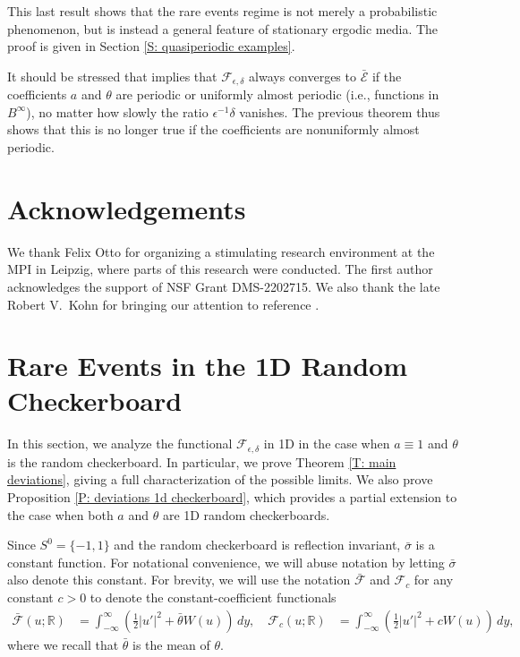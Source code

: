 \documentclass[10pt,a4paper]{amsart}
\begin{document}
This last result shows that the rare events regime is not merely a probabilistic phenomenon, but is instead a general feature of stationary ergodic media.  The proof is given in Section \ref{S: quasiperiodic examples}.

It should be stressed that \cite[Corollary 2]{part1} implies that $\mathscr{F}_{\epsilon,\delta}$ always converges to $\bar{\mathscr{E}}$ if the coefficients $a$ and $\theta$ are periodic or uniformly almost periodic (i.e., functions in $B^{\infty}$), no matter how slowly the ratio $\epsilon^{-1} \delta$ vanishes.  The previous theorem thus shows that this is no longer true if the coefficients are nonuniformly almost periodic.



\section*{Acknowledgements}  

We thank Felix Otto for organizing a stimulating research environment at the MPI in Leipzig, where parts of this research were conducted. The first author acknowledges the support of NSF Grant DMS-2202715.  We also thank the late Robert V.\ Kohn for bringing our attention to reference \cite{vanden-eijnden_westdickenberg}.

\tableofcontents




\section{Rare Events in the 1D Random Checkerboard} \label{S: heuristics}

In this section, we analyze the functional $\mathscr{F}_{\epsilon,\delta}$ in 1D in the case when $a \equiv 1$ and $\theta$ is the random checkerboard.  In particular, we prove Theorem \ref{T: main deviations}, giving a full characterization of the possible limits.  We also prove Proposition \ref{P: deviations 1d checkerboard}, which provides a partial extension to the case when both $a$ and $\theta$ are 1D random checkerboards.

Since $S^{0} = \{-1,1\}$ and the random checkerboard is reflection invariant, $\bar{\sigma}$ is a constant function.  For notational convenience, we will abuse notation by letting $\bar{\sigma}$ also denote this constant. For brevity, we will use the notation $\bar{\mathscr{F}}$ and $\mathscr{F}_{c}$ for any constant $c > 0$ to denote the constant-coefficient functionals
    \begin{align*}
        \bar{\mathscr{F}}(u; \mathbb{R}) &= \int_{-\infty}^{\infty} \left( \frac{1}{2} |u'|^{2} + \bar{\theta} W(u) \right) \, dy, \quad \mathscr{F}_{c}(u;\mathbb{R}) &= \int_{-\infty}^{\infty} \left( \frac{1}{2} |u'|^{2} + c W(u) \right) \, dy,
    \end{align*}
where we recall that $\bar{\theta}$ is the mean of $\theta$.
\end{document}
